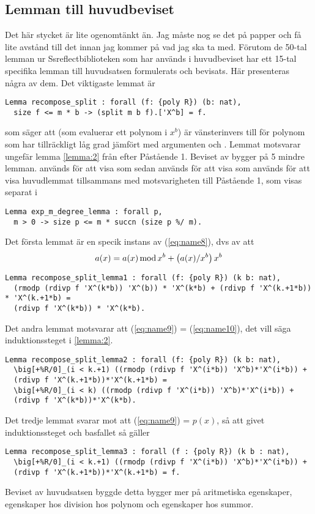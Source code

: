 \subsection{Lemman till huvudbeviset}
Det här stycket är lite ogenomtänkt än. Jag måste nog se det på papper och få
lite avstånd till det innan jag kommer på vad jag ska ta med. Förutom de 50-tal
lemman ur Ssreflectbiblioteken som har används i huvudbeviset har ett 15-tal
specifika lemman till huvudsatsen formulerats och bevisats. Här presenteras
några av dem. Det viktigaste lemmat är
\begin{lstlisting}
Lemma recompose_split : forall (f: {poly R}) (b: nat),
  size f <= m * b -> (split m b f).['X^b] = f.
\end{lstlisting}
som säger att  (som evaluerar ett polynom i $x^b$) är
vänsterinvers till  för polynom som har tillräckligt låg grad jämfört
med argumenten  och . Lemmat motsvarar ungefär lemma \ref{lemma:2}
från efter Påstående 1. Beviset av  bygger på 5 mindre
lemman.  används för att visa
 som sedan används för att visa
 som används för att visa huvudlemmat tillsammans med
motsvarigheten till Påstående 1, som visas separat i
\begin{lstlisting}
Lemma exp_m_degree_lemma : forall p,
  m > 0 -> size p <= m * succn (size p %/ m).
\end{lstlisting}
Det första lemmat är en specik instans av (\ref{eq:name8}), dvs av att
\begin{align}
  a(x)= a(x)  \operatorname*{mod} x^b + \left(a(x)/x^b\right) x^b \label{eq:name8}
\end{align}
\begin{lstlisting}
Lemma recompose_split_lemma1 : forall (f: {poly R}) (k b: nat),
  (rmodp (rdivp f 'X^(k*b)) 'X^(b)) * 'X^(k*b) + (rdivp f 'X^(k.+1*b)) * 'X^(k.+1*b) =
  (rdivp f 'X^(k*b)) * 'X^(k*b).
\end{lstlisting}
Det andra lemmat motsvarar att (\ref{eq:name9}) = (\ref{eq:name10}), det vill
säga induktionssteget
i \ref{lemma:2}.
\begin{lstlisting}
Lemma recompose_split_lemma2 : forall (f: {poly R}) (k b: nat),
  \big[+%R/0]_(i < k.+1) ((rmodp (rdivp f 'X^(i*b)) 'X^b)*'X^(i*b)) +
  (rdivp f 'X^(k.+1*b))*'X^(k.+1*b) =
  \big[+%R/0]_(i < k) ((rmodp (rdivp f 'X^(i*b)) 'X^b)*'X^(i*b)) +
  (rdivp f 'X^(k*b))*'X^(k*b).
\end{lstlisting}
Det tredje lemmat svarar mot att (\ref{eq:name9}) = $p(x)$, så att givet
induktionssteget  och basfallet
 så gäller
\begin{lstlisting}
Lemma recompose_split_lemma3 : forall (f : {poly R}) (k b : nat),
  \big[+%R/0]_(i < k.+1) ((rmodp (rdivp f 'X^(i*b)) 'X^b)*'X^(i*b)) +
  (rdivp f 'X^(k.+1*b))*'X^(k.+1*b) = f.
\end{lstlisting}
Beviset av huvudsatsen byggde detta bygger mer på aritmetiska egenskaper,
egenskaper hos division hos polynom och egenskaper hos summor.

